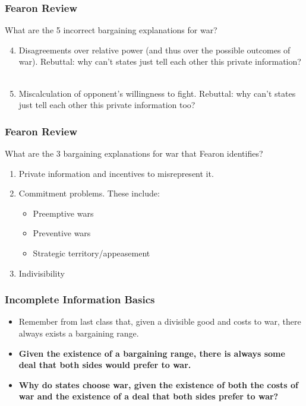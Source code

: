 \documentclass{beamer}
\begin{document}
\begin{frame} 
	\frametitle{\LARGE{Fearon Review}}
	What are the 5 incorrect bargaining explanations for war? 
	\begin{enumerate}
		\setcounter{enumi}{3}
		\item Disagreements over relative power (and thus over the possible outcomes of war). \pause Rebuttal: why can't states just tell each other this private information?
			\\~\\
		\item Miscalculation of opponent's willingness to fight. \pause Rebuttal: why can't states just tell each other this private information too?
	\end{enumerate}
\end{frame}

\begin{frame} 
	\frametitle{\LARGE{Fearon Review}}
	What are the 3 bargaining explanations for war that Fearon identifies? \pause
	\begin{enumerate}
		\item Private information and incentives to misrepresent it.
		\item Commitment problems. These include: \pause
		\begin{itemize}
			\item Preemptive wars
			\item Preventive wars
			\item Strategic territory/appeasement
		\end{itemize}
		\item Indivisibility
	\end{enumerate}
\end{frame}

\begin{frame} 
	\frametitle{\LARGE{Incomplete Information Basics}}
	\begin{itemize}
		\item Remember from last class that, given a divisible good and costs to war, there always exists a bargaining range. \pause
		\item \textbf{Given the existence of a bargaining range, there is always some deal that both sides would prefer to war.} \pause
		\item \textbf{Why do states choose war, given the existence of both the costs of war and the existence of a deal that both sides prefer to war?}
	\end{itemize}
\end{frame}
\end{document}
